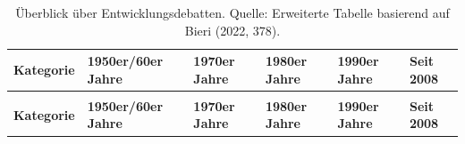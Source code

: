 \documentclass[
  nswissgerman,
  a4paper,
  DIV=11,
  numbers=noendperiod,
  oneside,
  openany]{scrreprt}
\begin{document}
\begin{longtable}[t]{>{\raggedright\arraybackslash}p{1.6cm}>{\raggedright\arraybackslash}p{2.3cm}>{\raggedright\arraybackslash}p{2.3cm}>{\raggedright\arraybackslash}p{2.3cm}>{\raggedright\arraybackslash}p{2.3cm}>{\raggedright\arraybackslash}p{2.3cm}}

\caption{\label{tbl-development-theories}Überblick über
Entwicklungsdebatten. Quelle: Erweiterte Tabelle basierend auf Bieri
(2022, 378).}

\tabularnewline

\toprule
\textbf{Kategorie} & \textbf{1950er/60er Jahre} & \textbf{1970er Jahre} & \textbf{1980er Jahre} & \textbf{1990er Jahre} & \textbf{Seit 2008}\\
\midrule
\endfirsthead
\multicolumn{6}{@{}l}{\textit{(continued)}}\\
\toprule
\textbf{Kategorie} & \textbf{1950er/60er Jahre} & \textbf{1970er Jahre} & \textbf{1980er Jahre} & \textbf{1990er Jahre} & \textbf{Seit 2008}\\
\midrule
\endhead


\end{longtable}
\end{document}
